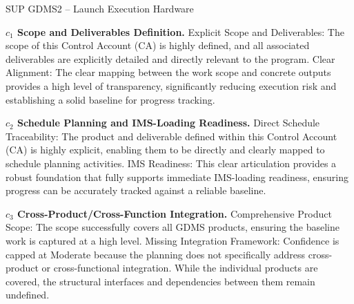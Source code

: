 %
\begin{frame}{SUP GDMS2 – Launch Execution Hardware}
\begin{minipage}{0.90\textwidth}
\raggedright
\fontsize{8}{9.5}\selectfont
\textbf{\(c_1\) Scope and Deliverables Definition.}
Explicit Scope and Deliverables: The scope of this Control Account (CA) is highly defined, and all associated deliverables are explicitly detailed and directly relevant to the program. Clear Alignment: The clear mapping between the work scope and concrete outputs provides a high level of transparency, significantly reducing execution risk and establishing a solid baseline for progress tracking.\par\vspace{0.6em}
\textbf{\(c_2\) Schedule Planning and IMS-Loading Readiness.}
Direct Schedule Traceability: The product and deliverable defined within this Control Account (CA) is highly explicit, enabling them to be directly and clearly mapped to schedule planning activities. IMS Readiness: This clear articulation provides a robust foundation that fully supports immediate IMS-loading readiness, ensuring progress can be accurately tracked against a reliable baseline.\par\vspace{0.6em}
\textbf{\(c_3\) Cross-Product/Cross-Function Integration.}
Comprehensive Product Scope: The scope successfully covers all GDMS products, ensuring the baseline work is captured at a high level. Missing Integration Framework: Confidence is capped at Moderate because the planning does not specifically address cross-product or cross-functional integration. While the individual products are covered, the structural interfaces and dependencies between them remain undefined.\par\vspace{0.6em}
\end{minipage}
\end{frame}

\endinput
